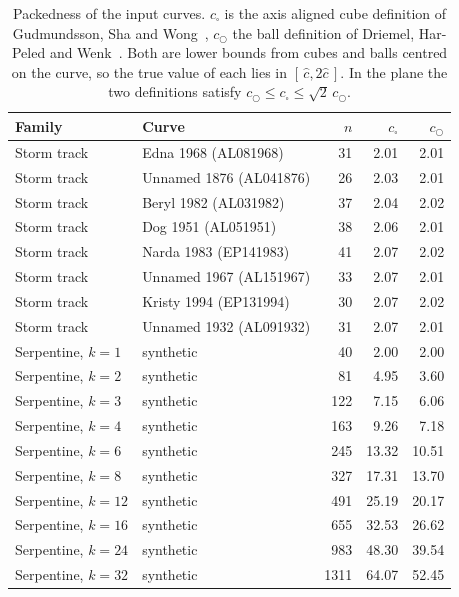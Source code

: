 \begin{table}[H]
\centering
\caption{Packedness of the input curves. $c_\square$ is the axis aligned cube
definition of Gudmundsson, Sha and Wong~\cite{GSW20}, $c_\bigcirc$ the ball
definition of Driemel, Har-Peled and Wenk~\cite{DHW12}. Both are lower bounds
from cubes and balls centred on the curve, so the true value of each lies in
$[\,\hat c, 2\hat c\,]$. In the plane the two definitions satisfy
$c_\bigcirc \le c_\square \le \sqrt{2}\, c_\bigcirc$.}
\label{tab:packedness}
\begin{tabular}{llrrr}
\toprule
\textbf{Family} & \textbf{Curve} & \textbf{$n$} & \textbf{$c_\square$} & \textbf{$c_\bigcirc$} \\
\midrule
Storm track & Edna 1968 (AL081968) & 31 & 2.01 & 2.01 \\
Storm track & Unnamed 1876 (AL041876) & 26 & 2.03 & 2.01 \\
Storm track & Beryl 1982 (AL031982) & 37 & 2.04 & 2.02 \\
Storm track & Dog 1951 (AL051951) & 38 & 2.06 & 2.01 \\
Storm track & Narda 1983 (EP141983) & 41 & 2.07 & 2.02 \\
Storm track & Unnamed 1967 (AL151967) & 33 & 2.07 & 2.01 \\
Storm track & Kristy 1994 (EP131994) & 30 & 2.07 & 2.02 \\
Storm track & Unnamed 1932 (AL091932) & 31 & 2.07 & 2.01 \\
\midrule
Serpentine, $k=1$ & synthetic & 40 & 2.00 & 2.00 \\
Serpentine, $k=2$ & synthetic & 81 & 4.95 & 3.60 \\
Serpentine, $k=3$ & synthetic & 122 & 7.15 & 6.06 \\
Serpentine, $k=4$ & synthetic & 163 & 9.26 & 7.18 \\
Serpentine, $k=6$ & synthetic & 245 & 13.32 & 10.51 \\
Serpentine, $k=8$ & synthetic & 327 & 17.31 & 13.70 \\
Serpentine, $k=12$ & synthetic & 491 & 25.19 & 20.17 \\
Serpentine, $k=16$ & synthetic & 655 & 32.53 & 26.62 \\
Serpentine, $k=24$ & synthetic & 983 & 48.30 & 39.54 \\
Serpentine, $k=32$ & synthetic & 1311 & 64.07 & 52.45 \\
\bottomrule
\end{tabular}
\end{table}
